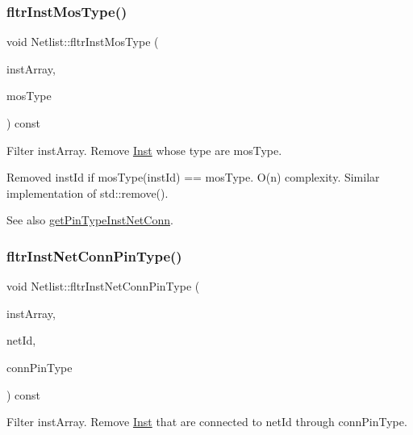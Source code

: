 \subsubsection{\texorpdfstring{fltr\+Inst\+Mos\+Type()}{fltrInstMosType()}}
{\footnotesize\ttfamily void Netlist\+::fltr\+Inst\+Mos\+Type (\begin{DoxyParamCaption}\item[{std\+::vector$<$ \hyperlink{type_8h_a581e8093e28e7362f2b6937296190676}{Index\+Type} $>$ \&}]{inst\+Array,  }\item[{\hyperlink{type_8h_a34a6a66323cfecf83dfe00bc8fd96333}{Mos\+Type}}]{mos\+Type }\end{DoxyParamCaption}) const}



Filter inst\+Array. Remove \hyperlink{classInst}{Inst} whose type are mos\+Type. 

Removed inst\+Id if mos\+Type(inst\+Id) == mos\+Type. O(n) complexity. Similar implementation of std\+::remove().

\begin{DoxySeeAlso}{See also}
\hyperlink{classNetlist_a6bc6f9666ed8c833b967c38f2e164a1e}{get\+Pin\+Type\+Inst\+Net\+Conn}. 
\end{DoxySeeAlso}
\mbox{\label{classNetlist_a525b81a4d2bba3c381c9d76be91acba8}} 
\subsubsection{\texorpdfstring{fltr\+Inst\+Net\+Conn\+Pin\+Type()}{fltrInstNetConnPinType()}}
{\footnotesize\ttfamily void Netlist\+::fltr\+Inst\+Net\+Conn\+Pin\+Type (\begin{DoxyParamCaption}\item[{std\+::vector$<$ \hyperlink{type_8h_a581e8093e28e7362f2b6937296190676}{Index\+Type} $>$ \&}]{inst\+Array,  }\item[{\hyperlink{type_8h_a581e8093e28e7362f2b6937296190676}{Index\+Type}}]{net\+Id,  }\item[{\hyperlink{type_8h_afaab50027002ecbb6c8ac27e727d1bb4}{Pin\+Type}}]{conn\+Pin\+Type }\end{DoxyParamCaption}) const}



Filter inst\+Array. Remove \hyperlink{classInst}{Inst} that are connected to net\+Id through conn\+Pin\+Type. 

